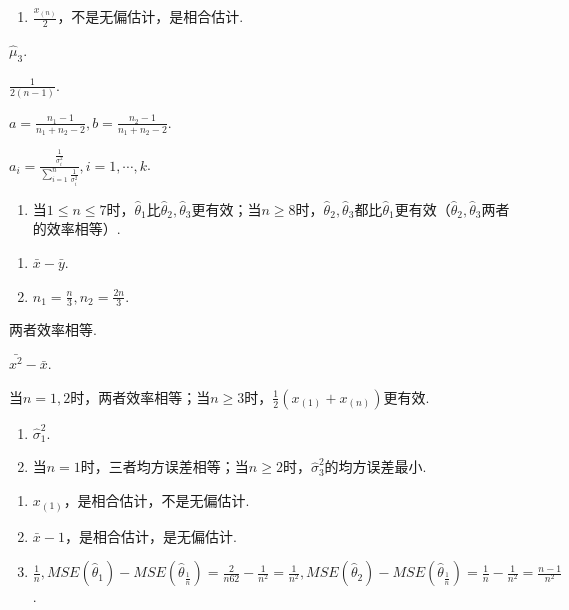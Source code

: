 \begin{answer}
  \item \begin{enumerate}
    \item $\frac{x_{(n)}}2$，不是无偏估计，是相合估计.
  \end{enumerate}
  \item $\hat \mu_3$.
  \setcounter{enumi}{3}
  \item $\frac1{2(n-1)}$.
  \setcounter{enumi}{5}
  \item $a=\frac{n_1-1}{n_1+n_2-2},b=\frac{n_2-1}{n_1+n_2-2}$.
  \item $a_i=\frac{\frac1{\sigma_i^2}}{\sum_{i=1}^n\frac1{\sigma_i^2}},
      i=1,\cdots,k$.
  \item \begin{enumerate}
    \item 当$1\le n\le7$时，$\hat\theta_1$比$\hat\theta_2,\hat\theta_3$更有效；当$n\ge8$时，$\hat\theta_2,\hat\theta_3$都比$\hat\theta_1$更有效（$\hat\theta_2,\hat\theta_3$两者的效率相等）.
  \end{enumerate}
  \item \begin{enumerate}
    \item $\bar x-\bar y$.
    \item $n_1=\frac n3,n_2=\frac{2n}3$.
  \end{enumerate}
  \item 两者效率相等.
  \item $\bar{x^2}-\bar x$.
  \item 当$n=1,2$时，两者效率相等；当$n\ge3$时，$\frac12(x_{(1)}+x_{(n)})$更有效.
  \item \begin{enumerate}
    \item $\hat\sigma_1^2$.
    \item 当$n=1$时，三者均方误差相等；当$n\ge2$时，$\hat\sigma_3^2$的均方误差最小.
  \end{enumerate}
  \item \begin{enumerate}
    \item $x_{(1)}$，是相合估计，不是无偏估计.
    \item $\bar x-1$，是相合估计，是无偏估计.
    \item $\frac1n,MSE(\hat\theta_1)-MSE(\hat\theta_{\frac1n})
    =\frac2{n62}-\frac1{n^2}=\frac1{n^2},MSE(\hat\theta_2)-
    MSE(\hat\theta_{\frac1n})=\frac1n-\frac1{n^2}=\frac{n-1}{n^2}$.
  \end{enumerate}
\end{answer}

